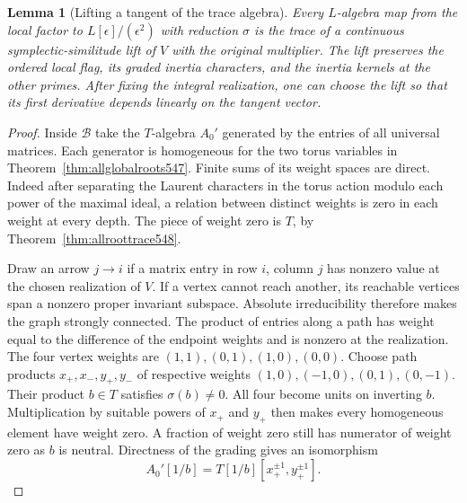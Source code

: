 \documentclass[a4paper,11pt]{article}
\newtheorem{lemma}[proposition]{Lemma}
\theoremstyle{definition}
\theoremstyle{remark}
\numberwithin{equation}{section}
\begin{document}
\begin{lemma}[Lifting a tangent of the trace algebra]
\leavevmode\label{lem:rankfourtangent558}
Every \(L\)-algebra map from the local factor to
\(L[\epsilon]/(\epsilon^2)\) with reduction \(\sigma\) is the
trace of a continuous symplectic-similitude lift of \(V\) with
the original multiplier. The lift preserves the ordered local
flag, its graded inertia characters, and the inertia kernels at
the other primes. After fixing the integral realization, one can
choose the lift so that its first derivative depends linearly
on the tangent vector.
\end{lemma}
\begin{proof}
Inside \(\mathcal B\) take the \(T\)-algebra \(A_0'\) generated by
the entries of all universal matrices. Each generator is
homogeneous for the two torus variables in
Theorem~\ref{thm:allglobalroots547}. Finite sums of its weight
spaces are direct. Indeed after separating the Laurent characters
in the torus action modulo each power of the maximal ideal, a
relation between distinct weights is zero in each weight at every
depth. The piece of weight zero is \(T\), by
Theorem~\ref{thm:allroottrace548}.

Draw an arrow \(j\to i\) if a matrix entry in row \(i\), column
\(j\) has nonzero value at the chosen realization of \(V\).
If a vertex cannot reach another, its reachable vertices span
a nonzero proper invariant subspace. Absolute irreducibility
therefore makes the graph strongly connected. The product of
entries along a path has weight equal to the difference of the
endpoint weights and is nonzero at the realization. The four
vertex weights are \((1,1),(0,1),(1,0),(0,0)\). Choose path
products \(x_+,x_-,y_+,y_-\) of respective weights
\((1,0),(-1,0),(0,1),(0,-1)\). Their product \(b\in T\)
satisfies \(\sigma(b)\ne0\). All four become units on inverting
\(b\). Multiplication by suitable powers of \(x_+\) and \(y_+\)
then makes every homogeneous element have weight zero. A fraction
of weight zero still has numerator of weight zero as \(b\) is
neutral. Directness of the grading gives an isomorphism
\[
     A_0'[1/b]=T[1/b][x_+^{\pm1},y_+^{\pm1}].
\]


\end{proof}
\end{document}
